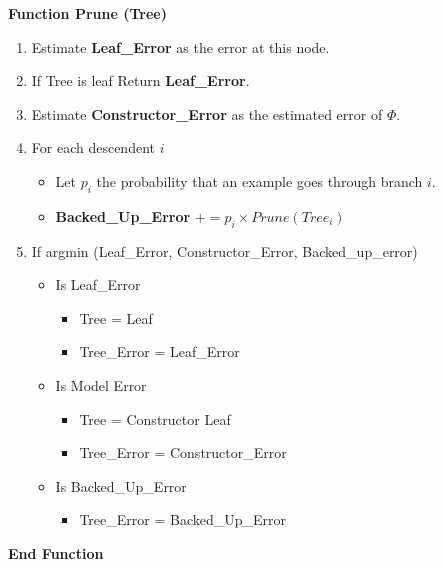
\textbf{Function Prune (Tree)}
 \begin{enumerate}
 	\item Estimate \textbf{Leaf\_Error} as the error at this node.
	\item If Tree is leaf Return \textbf{Leaf\_Error}.
 	\item Estimate \textbf{Constructor\_Error} as the estimated error of $\Phi$.
 	\item For each descendent $i$
 	\begin{itemize}
 		\item Let $p_i$ the probability that an example goes through branch $i$.
 		\item \textbf{Backed\_Up\_Error} $+= p_i \times Prune \left(Tree_i\right)$
 	\end{itemize}
 	\item If argmin (Leaf\_Error, Constructor\_Error, Backed\_up\_error)
 	\begin{itemize}
 		\item Is Leaf\_Error
 		\begin{itemize}
 			\item Tree = Leaf
			\item Tree\_Error = Leaf\_Error
 		\end{itemize}
 		\item Is Model Error
 		\begin{itemize}
 			\item Tree = Constructor Leaf
 			\item Tree\_Error = Constructor\_Error
 		\end{itemize}
 		\item Is Backed\_Up\_Error
 		\begin{itemize}
 			\item Tree\_Error = Backed\_Up\_Error
 		\end{itemize}
 	\end{itemize}	
 \end{enumerate} 
\textbf{End Function}

